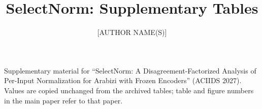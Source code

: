 \documentclass[runningheads]{llncs}
\begin{document}
\title{SelectNorm: Supplementary Tables}
\author{[AUTHOR NAME(S)]}\institute{[AFFILIATION]}
\maketitle
\noindent Supplementary material for ``SelectNorm: A Disagreement-Factorized Analysis of Per-Input Normalization for Arabizi with Frozen Encoders'' (ACIIDS 2027). Values are copied unchanged from the archived tables; table and figure numbers in the main paper refer to that paper.

\begin{table}[!htb]\centering\scriptsize\setlength{\tabcolsep}{3pt}
\caption{Paired differences in macro-F1 (SelectNorm-adapt minus baseline, $\lambda=0$, seed-averaged) with 95\% paired-bootstrap intervals (10{,}000 resamples of test sentences). $^{*}$: Holm-corrected $p<0.05$ over the protocol's 20 comparisons per encoder. $^{\dagger}$: the interval lies inside $(-1,+1)$, the protocol's relevance margin; reading this as equivalence is post hoc and not corrected for multiplicity. Intervals without either mark are inconclusive about both difference and equivalence.}
\resizebox{\textwidth}{!}{}\end{table}

\begin{table}[!htb]\centering\scriptsize\setlength{\tabcolsep}{3.5pt}
\caption{As Table~2 of the paper, with $f$ also trained on synthetic Latin renderings (\textsc{+syn}, exploratory regime).}
\resizebox{\textwidth}{!}{}\end{table}

\begin{table}[!htb]\centering\footnotesize\setlength{\tabcolsep}{3pt}
\caption{Routing behaviour (mE5, $\lambda=0$): selection rate, harmful transformations per 100 inputs, share of oracle opportunities captured, and estimated cost relative to B0. Help/harm: number of inputs where normalisation corrects/introduces an error.}
\resizebox{\textwidth}{!}{}\end{table}

\begin{table}[!htb]\centering\scriptsize\setlength{\tabcolsep}{4pt}
\caption{95\% intervals for the mechanism measurements of Table~3 of the paper (1{,}000 bootstrap resamples of test sentences, seed-averaged within each resample; estimators not refitted).}
\resizebox{\textwidth}{!}{}\end{table}
\end{document}
